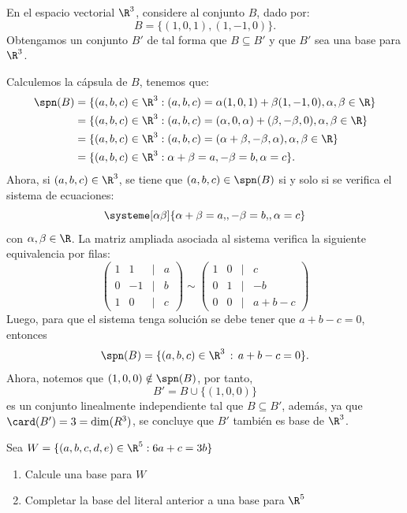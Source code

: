 \documentclass[compacto,10pt]{pubciencias-notas}
\begin{document}
\begin{ejem}\hspace{0pt}
En el espacio vectorial $\R^{3}$, considere al conjunto $B$, dado por:
\[
    B = \{(1, 0, 1), (1, -1, 0)\}.
\]
Obtengamos un conjunto $B'$ de tal forma que $B \subseteq B'$ y que $B'$ sea una base para $\R^{3}$.

Calculemos la cápsula de $B$, tenemos que:
\begin{align*}
\spn(B) &= 
    \{(a, b, c) \in \R^{3}:(a, b, c)=\alpha (1, 0, 1)+\beta (1, -1, 0), \alpha, \beta\in\R\}\\
    &=\{(a, b, c) \in \R^{3}:(a, b, c)=(\alpha , 0, \alpha)+ (\beta, -\beta, 0), \alpha, \beta\in\R \}\\
    &=\{(a, b, c) \in \R^{3}:(a, b, c)=(\alpha +\beta,-\beta , \alpha), \alpha, \beta\in\R\}\\
    &=\{(a, b, c) \in \R^{3}:\alpha +\beta=a,-\beta =b, \alpha=c \}.
\end{align*}
Ahora, si $(a,b,c)\in\R^{3}$, se tiene que $(a,b,c)\in\spn(B)$ si y solo si se verifica el sistema de ecuaciones:
\[
    \systeme[\alpha \beta]{\alpha + \beta =a{,}, -\beta=b{,},\alpha=c}
\]
con $\alpha, \beta \in\R$. La matriz ampliada asociada al sistema verifica la siguiente equivalencia por filas:
\[
\begin{pmatrix}
1&1&|&a\\
0&-1&|&b\\
1&0&|&c
\end{pmatrix}
\sim 
\begin{pmatrix}
1&0&|&c\\
0&1&|&-b\\
0&0&|&a+b-c
\end{pmatrix}
\]
Luego, para que el sistema tenga solución se debe tener que $a+b-c=0$, entonces
\[
    \spn(B) = \{(a,b,c)\in\R^{3}\,:\,a+b-c=0\}.
\]
Ahora, notemos que $(1,0,0)\notin\spn(B)$, por tanto,
\[
    B' = B \cup \{(1,0,0)\}
\]
es un conjunto linealmente independiente tal que $B\subseteq B'$, además, ya que $\card(B')=3 = \dim(R^{3})$, se concluye que $B'$ también es base de $\R^{3}$.
\end{ejem}
    
\begin{ejer}\hspace{0pt}
\item
    Sea $W = \{(a,b,c,d,e) \in \R^5 : 6a+c=3b\}$
    \begin{enumerate}
    \item
        Calcule una base para $W$
    \item
        Completar la base del literal anterior a una base para $\R^5$
    
    \end{enumerate}
\end{ejer}
\end{document}
